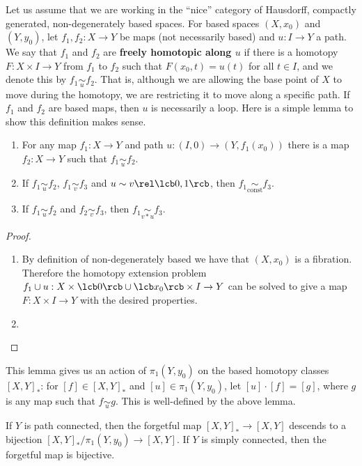 Let us assume that we are working in the ``nice'' category of Hausdorff, compactly generated, non-degenerately based spaces. For based spaces $(X,x_0)$ and $(Y,y_0)$, let $f_1,f_2 : X \rightarrow Y$ be maps (not necessarily based) and $u : I \rightarrow Y$ a path. We say that $f_1$ and $f_2$ are \textbf{freely homotopic along $u$} if there is a homotopy $F : X \times I \rightarrow Y$ from $f_1$ to $f_2$ such that $F(x_0,t) = u(t)$ for all $t \in I$, and we denote this by $f_1 \underset{u}{\sim} f_2$. That is, although we are allowing the base point of $X$ to move during the homotopy, we are restricting it to move along a specific path. If $f_1$ and $f_2$ are based maps, then $u$ is necessarily a loop. Here is a simple lemma to show this definition makes sense.

\begin{lem}
\sloppyspace
\begin{enumerate}
	\item For any map $f_1 : X \rightarrow Y$ and path $u : (I,0) \rightarrow (Y,f_1(x_0))$ there is a map $f_2 : X \rightarrow Y$ such that $f_1 \underset{u}{\sim} f_2$.
	\item If $f_1 \underset{u}{\sim} f_2$, $f_1 \underset{v}{\sim} f_3$ and $u \sim v \rel \lcb 0,1 \rcb$, then $f_1 \underset{\text{const}}{\sim} f_3$.
	\item If $f_1 \underset{u}{\sim} f_2$ and $f_2 \underset{v}{\sim} f_3$, then $f_1 \underset{v * u}{\sim} f_3$.
\end{enumerate}
\end{lem}
\begin{proof}
\sloppyspace
\begin{enumerate}
	\item By definition of non-degenerately based we have that $(X,x_0)$ is a fibration. Therefore the homotopy extension problem $f_1 \cup u : X \times \lcb 0 \rcb \cup \lcb x_0 \rcb \times I \rightarrow Y$ can be solved to give a map $F : X \times I \rightarrow Y$ with the desired properties.
	\item 
\end{enumerate}
\end{proof}

This lemma gives us an action of $\pi_1(Y,y_0)$ on the based homotopy classes $[X,Y]_*$: for $[f] \in [X,Y]_*$ and $[u] \in \pi_1(Y,y_0)$, let $[u] \cdot [f] = [g]$, where $g$ is any map such that $f \underset{u}{\sim} g$. This is well-defined by the above lemma.

\begin{prop}
If $Y$ is path connected, then the forgetful map $[X,Y]_* \rightarrow [X,Y]$ descends to a bijection $[X,Y]_* / \pi_1(Y,y_0) \rightarrow [X,Y]$. If $Y$ is simply connected, then the forgetful map is bijective.
\end{prop}







